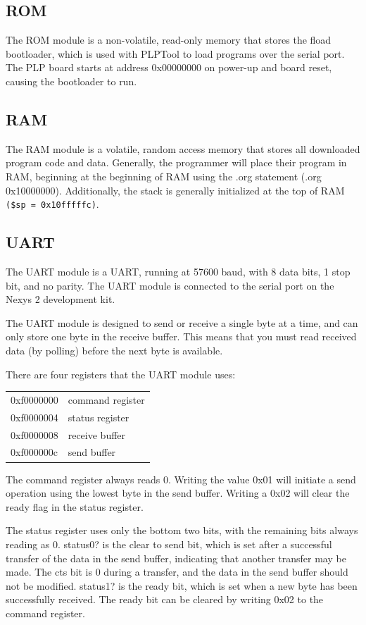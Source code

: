 \documentclass{article}
\begin{document}
\subsection{ROM}
The ROM module is a non-volatile, read-only memory that stores the fload bootloader, which is used with PLPTool to load programs over the serial port. The PLP board starts at address 0x00000000 on power-up and board reset, causing the bootloader to run. 
\subsection{RAM}
The RAM module is a volatile, random access memory that stores all downloaded program code and data. Generally, the programmer will place their program in RAM, beginning at the beginning of RAM using the .org statement (.org 0x10000000). Additionally, the stack is generally initialized at the top of RAM \verb+($sp = 0x10fffffc)+.
\subsection{UART}
The UART module is a UART, running at 57600 baud, with 8 data bits, 1 stop bit, and no parity. The UART module is connected to the serial port on the Nexys 2 development kit.

The UART module is designed to send or receive a single byte at a time, and can only store one byte in the receive buffer. This means that you must read received data (by polling) before the next byte is available.

There are four registers that the UART module uses: 

\begin{tabular}{ | l | l | }
\hline
0xf0000000 & command register \\
0xf0000004 & status register \\
0xf0000008 & receive buffer \\
0xf000000c & send buffer \\
\hline
\end{tabular}

The command register always reads 0. Writing the value 0x01 will initiate a send operation using the lowest byte in the send buffer. Writing a 0x02 will clear the ready flag in the status register.

The status register uses only the bottom two bits, with the remaining bits always reading as 0. status0? is the clear to send bit, which is set after a successful transfer of the data in the send buffer, indicating that another transfer may be made. The cts bit is 0 during a transfer, and the data in the send buffer should not be modified. status1? is the ready bit, which is set when a new byte has been successfully received. The ready bit can be cleared by writing 0x02 to the command register.
\end{document}
